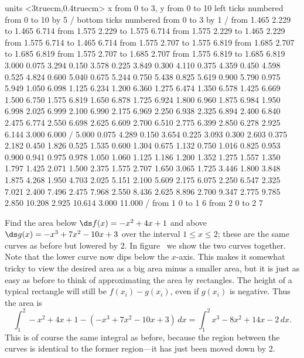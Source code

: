 \figure
\vbox{\beginpicture
\normalgraphs
\ninepoint
\setcoordinatesystem units <3truecm,0.4truecm>
\setplotarea x from 0 to 3, y from 0 to 10
\axis left ticks numbered from 0 to 10 by 5 /
\axis bottom  ticks numbered from 0 to 3 by 1 /
\setquadratic
\putrule from 1.465 2.229 to 1.465 6.714
\putrule from 1.575 2.229 to 1.575 6.714
\putrule from 1.575 2.229 to 1.465 2.229
\putrule from 1.575 6.714 to 1.465 6.714
%
\putrule from 1.575 2.707 to 1.575 6.819
\putrule from 1.685 2.707 to 1.685 6.819
\putrule from 1.575 2.707 to 1.685 2.707
\putrule from 1.575 6.819 to 1.685 6.819
 3.000 0.075 3.294 0.150 3.578 0.225 3.849 0.300 4.110 
0.375 4.359 0.450 4.598 0.525 4.824 0.600 5.040 0.675 5.244 
0.750 5.438 0.825 5.619 0.900 5.790 0.975 5.949 1.050 6.098 
1.125 6.234 1.200 6.360 1.275 6.474 1.350 6.578 1.425 6.669 
1.500 6.750 1.575 6.819 1.650 6.878 1.725 6.924 1.800 6.960 
1.875 6.984 1.950 6.998 2.025 6.999 2.100 6.990 2.175 6.969 
2.250 6.938 2.325 6.894 2.400 6.840 2.475 6.774 2.550 6.698 
2.625 6.609 2.700 6.510 2.775 6.399 2.850 6.278 2.925 6.144 
3.000 6.000 /
 5.000 0.075 4.289 0.150 3.654 0.225 3.093 0.300 2.603 
0.375 2.182 0.450 1.826 0.525 1.535 0.600 1.304 0.675 1.132 
0.750 1.016 0.825 0.953 0.900 0.941 0.975 0.978 1.050 1.060 
1.125 1.186 1.200 1.352 1.275 1.557 1.350 1.797 1.425 2.071 
1.500 2.375 1.575 2.707 1.650 3.065 1.725 3.446 1.800 3.848 
1.875 4.268 1.950 4.703 2.025 5.151 2.100 5.609 2.175 6.075 
2.250 6.547 2.325 7.021 2.400 7.496 2.475 7.968 2.550 8.436 
2.625 8.896 2.700 9.347 2.775 9.785 2.850 10.208 2.925 10.614 
3.000 11.000 /
\setdashes
\putrule from 1 0 to 1 6
\putrule from 2 0 to 2 7
\setsolid
\endpicture}

\begin{example} Find the area below $\ds f(x)= -x^2+4x+1$ and above
$\ds g(x)=-x^3+7x^2-10x+3$ over the interval $1\le x\le2$; these are the
same curves as before but lowered by 2. In
figure~ we show the two curves
together. Note that the lower curve now dips below the $x$-axis. This
makes it somewhat tricky to view the desired area as a big area minus
a smaller area, but it is just as easy as before to think of
approximating the area by rectangles. The height of a typical
rectangle will still be $f(x_i)-g(x_i)$, even if $g(x_i)$ is
negative. Thus the area is 
$$
  \int_1^2 -x^2+4x+1-(-x^3+7x^2-10x+3)\,dx
  =\int_1^2 x^3-8x^2+14x-2\,dx.
$$
This is of course the same integral as before, because the region
between the curves is identical to the former region---it has just
been moved down by 2.
\end{example}

